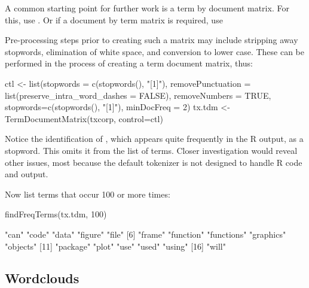 A common starting point for further work is a term by document matrix.
For this, use .  Or if a
document by term matrix is required, use 

Pre-processing steps prior to creating such a matrix may include
stripping away stopwords, elimination of white space, and conversion
to lower case.  These can be performed in the process of creating a
term document matrix, thus:
\begin{fullwidth}
\begin{Schunk}
\begin{Sinput}
ctl <- list(stopwords = c(stopwords(), "[1]"),
            removePunctuation = list(preserve_intra_word_dashes = FALSE),
            removeNumbers = TRUE, stopwords=c(stopwords(), "[1]"),
            minDocFreq = 2)
tx.tdm <- TermDocumentMatrix(txcorp, control=ctl)
\end{Sinput}
\end{Schunk}
\end{fullwidth}
\noindent
Notice the identification of \txtt{[1]}, which appears quite
frequently in the R output, as a stopword.  This omits it from the
list of terms.  Closer investigation would reveal other issues, most
because the default tokenizer is not designed to handle
R code and output.

Now list terms that occur 100 or more times:
\begin{fullwidth}
\begin{Schunk}
\begin{Sinput}
findFreqTerms(tx.tdm, 100)
\end{Sinput}
\begin{Soutput}
 [1] "can"       "code"      "data"      "figure"    "file"     
 [6] "frame"     "function"  "functions" "graphics"  "objects"  
[11] "package"   "plot"      "use"       "used"      "using"    
[16] "will"     
\end{Soutput}
\end{Schunk}
\end{fullwidth}

\subsection*{Wordclouds}

